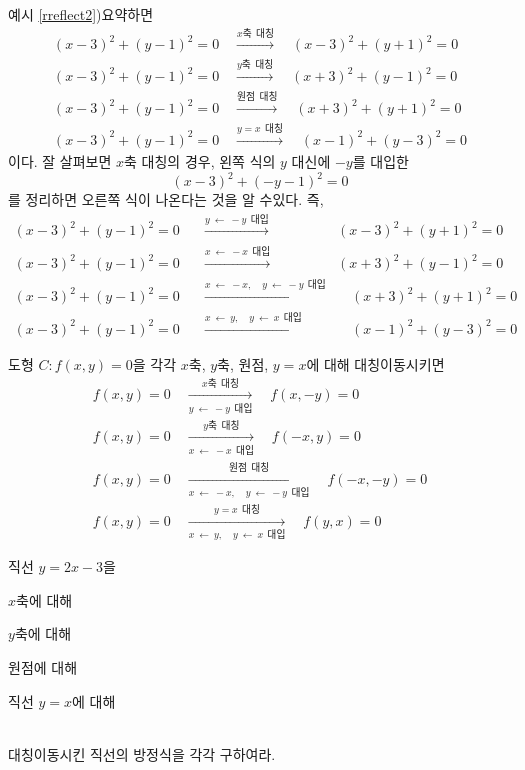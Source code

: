 \documentclass{oblivoir}
\begin{document}
\newpage
예시 \ref{rreflect2})\를 요약하면
\begin{gather*}
(x-3)^2+(y-1)^2=0\quad\xrightarrow{x축\:\:대칭}\quad(x-3)^2+(y+1)^2=0\\
(x-3)^2+(y-1)^2=0\quad\xrightarrow{y축\:\:대칭}\quad(x+3)^2+(y-1)^2=0\\
(x-3)^2+(y-1)^2=0\quad\xrightarrow{원점\:\:대칭}\quad(x+3)^2+(y+1)^2=0\\
(x-3)^2+(y-1)^2=0\quad\xrightarrow{y=x\:\:대칭}\quad(x-1)^2+(y-3)^2=0
\end{gather*}
이다.
잘 살펴보면 \(x\)축 대칭의 경우,  왼쪽 식의 \(y\) 대신에 \(-y\)를 대입한
\[(x-3)^2+(-y-1)^2=0\]
를 정리하면 오른쪽 식이 나온다는 것을 알 수있다.
즉,
\begin{align*}
(x-3)^2+(y-1)^2=0&\quad\xrightarrow{y\:\leftarrow\: -y\:\:대입}\quad&(x-3)^2+(y+1)^2=0\\
(x-3)^2+(y-1)^2=0&\quad\xrightarrow{x\:\leftarrow\: -x\:\:대입}\quad&(x+3)^2+(y-1)^2=0\\
(x-3)^2+(y-1)^2=0&\quad\xrightarrow{x\:\leftarrow\: -x,\quad y\:\leftarrow\: -y\:\:대입}
&\quad(x+3)^2+(y+1)^2=0&\\
(x-3)^2+(y-1)^2=0&\quad\xrightarrow{x\:\leftarrow\: y,\quad y\:\leftarrow\: x\:\:대입}
&\quad(x-1)^2+(y-3)^2=0
\end{align*}

\begin{mdframed}
%
\label{rreflect3}
도형 \(C:f(x,y)=0\)을 각각 \(x\)축, \(y\)축, 원점, \(y=x\)에 대해 대칭이동시키면
\begin{gather*}
f(x,y)=0
\quad\xrightarrow[y\:\leftarrow\: -y\:\:대입]{x축\:\:대칭}\quad
f(x,-y)=0
\\[10pt]
f(x,y)=0
\quad\xrightarrow[x\:\leftarrow\: -x\:\:대입]{y축\:\:대칭}\quad
f(-x,y)=0
\\[10pt]
f(x,y)=0
\quad\xrightarrow[x\:\leftarrow\: -x,\quad y\:\leftarrow\: -y\:\:대입]{원점\:\:대칭}\quad
f(-x,-y)=0
\\[10pt]
f(x,y)=0
\quad\xrightarrow[x\:\leftarrow\: y,\quad y\:\leftarrow\: x\:\:대입]{y=x\:\:대칭}\quad
f(y,x)=0
\end{gather*}
\end{mdframed}

\newpage
%
\exam{}\label{rreflect4}
직선 \(y=2x-3\)을\\[10pt]
\begin{enumerate*}[itemjoin={,\quad}]
\item
\(x\)축에 대해
\item
\(y\)축에 대해
\item
원점에 대해
\item
직선 \(y=x\)에 대해
\end{enumerate*}
\\[10pt]
대칭이동시킨 직선의 방정식을 각각 구하여라.
\end{document}
